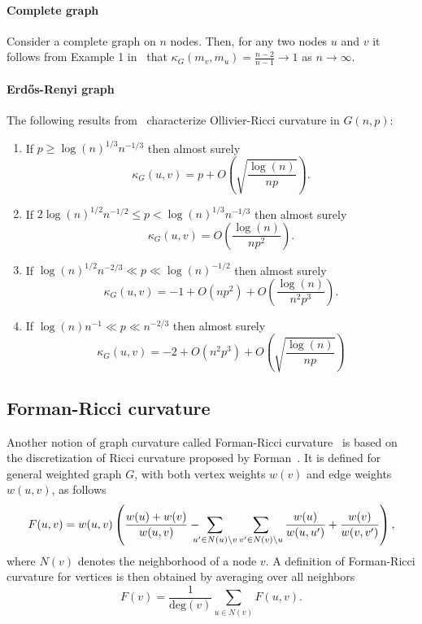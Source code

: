 \documentclass{article}
\begin{document}
\paragraph{Complete graph}

Consider a complete graph on $n$ nodes. Then, for any two nodes $u$ and $v$ it follows from Example 1 in~\cite{jost2014ollivier} that $\kappa_G(m_v, m_u) = \frac{n-2}{n-1} \to 1$ as $n \to \infty$.

\paragraph{Erd\H{o}s-Renyi graph}

The following results from~\cite{lin2011ricci} characterize Ollivier-Ricci curvature in $G(n,p)$:

\begin{enumerate}
\item If $p \ge \log(n)^{1/3} n^{-1/3}$ then almost surely
\[
	\kappa_G(u,v) = p + O\left(\sqrt{\frac{\log(n)}{n p}}\right).
\]
\item If $2 \log(n)^{1/2} n^{-1/2} \le p < \log(n)^{1/3} n^{-1/3}$ then almost surely
\[
	\kappa_G(u,v) = O\left(\frac{\log(n)}{n p^2}\right).
\]
\item If $\log(n)^{1/2} n^{-2/3} \ll p \ll \log(n)^{-1/2}$ then almost surely
\[
	\kappa_G(u,v) = -1 + O\left(n p^2\right) + O\left(\frac{\log(n)}{n^2 p^3}\right).
\]
\item If $\log(n) n^{-1} \ll p \ll n^{-2/3}$ then almost surely
\[
	\kappa_G(u,v) = -2 + O\left(n^2 p^3\right) + O\left(\sqrt{\frac{\log(n)}{np}}\right)
\]
\end{enumerate}

\subsection{Forman-Ricci curvature}

Another notion of graph curvature called Forman-Ricci curvature~\cite{sreejith2016forman} is based on the discretization of Ricci curvature proposed by Forman~\cite{forman2003bochner}. It is defined for general weighted graph $G$, with both vertex weights $w(v)$ and edge weights $w(u,v)$, as follows
\begin{equation}\label{eq:def_forman_curvature_edges}
	F(u,v) = w(u,v) \left(\frac{w(u) + w(v)}{w(u,v)} - \hspace{-8pt}\sum_{u^\prime \in N(u)\setminus v} \sum_{v^\prime \in N(v) \setminus u} \frac{w(u)}{w(u,u^\prime)} + \frac{w(v)}{w(v,v^\prime)}\right),
\end{equation}
where $N(v)$ denotes the neighborhood of a node $v$. A definition of Forman-Ricci curvature for vertices is then obtained by averaging over all neighbors
\begin{equation}\label{eq:def_forman_curvature_nodes}
	F(v) = \frac{1}{\mathrm{deg}(v)} \sum_{u \in N(v)} F(u,v).
\end{equation}
\end{document}
